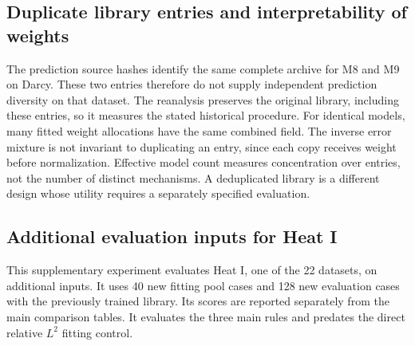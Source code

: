 \begin{table}[p]
\centering\footnotesize
\caption{\textbf{All headline comparisons under each fixed scope.} The four
values of $N$ refer to Table~\ref{tab:reviewsensitivity}. Best library and best
baseline are retrospective minima of partition averaged errors. W, T, and L
use the one percent threshold. Methods use five fitting examples.}
\label{tab:reviewsubsets}
\end{table}

\begin{table}[p]
\centering\footnotesize
\caption{\textbf{Budget and subset sensitivity of the two mixtures.} Ratios compare with the selected model within each scope.
$N=17,14,15$ denote the historical, audit retained, and common baseline subsets.
All fits share the original models.}
\label{tab:reviewbudgets}
\end{table}

\subsection{Duplicate library entries and interpretability of weights}
The prediction source hashes identify the same complete archive for M8 and M9
on Darcy. These two entries therefore do not supply independent
prediction diversity on that dataset. The reanalysis preserves the original
library, including these entries, so it measures the stated historical procedure.
For identical models, many fitted weight allocations have the same combined
field. The inverse error mixture is not invariant to duplicating an entry, since each
copy receives weight before normalization. Effective model count measures
concentration over entries, not the number of distinct mechanisms. A deduplicated
library is a different design whose utility requires a separately specified
evaluation.

\subsection{Additional evaluation inputs for Heat I}
\label{app:additionalheat}
This supplementary experiment evaluates Heat I, one of the 22 datasets, on
additional inputs. It uses 40 new fitting pool cases and 128 new evaluation
cases with the previously trained library. Its scores are reported separately
from the main comparison tables. It evaluates the three main rules and
predates the direct relative $L^2$ fitting control.
\begin{table}[h!]
\centering\small
\caption{\textbf{Additional Heat I inputs.} Mean relative $L^2$ errors in percent. Three
fitting selections share the same 128 evaluation cases and trained models.
Selected model, inverse error mixture, and fitted mixture are the fixed rules in Section~\ref{sec:method}.}
\label{tab:fresh}
\end{table}
